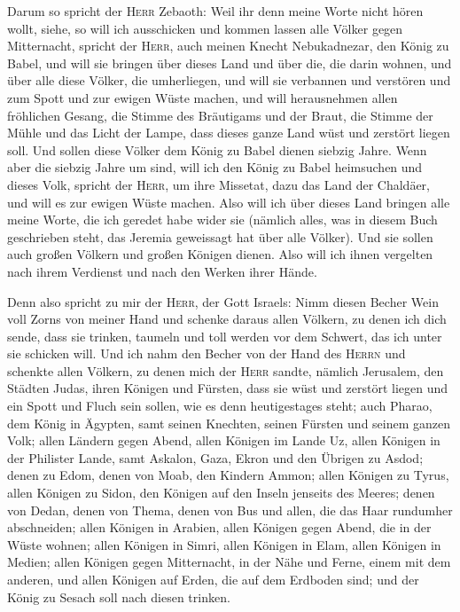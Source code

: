  Darum so spricht der \textsc{Herr} Zebaoth: Weil ihr denn
meine Worte nicht hören wollt,  siehe, so will ich
ausschicken und kommen lassen alle Völker gegen Mitternacht, spricht der
\textsc{Herr}, auch meinen Knecht Nebukadnezar, den König zu Babel, und
will sie bringen über dieses Land und über die, die darin wohnen, und
über alle diese Völker, die umherliegen, und will sie verbannen und
verstören und zum Spott und zur ewigen Wüste machen,  und
will herausnehmen allen fröhlichen Gesang, die Stimme des Bräutigams und
der Braut, die Stimme der Mühle und das Licht der Lampe, 
dass dieses ganze Land wüst und zerstört liegen soll. Und sollen diese
Völker dem König zu Babel dienen siebzig Jahre.  Wenn
aber die siebzig Jahre um sind, will ich den König zu Babel heimsuchen
und dieses Volk, spricht der \textsc{Herr}, um ihre Missetat, dazu das
Land der Chaldäer, und will es zur ewigen Wüste machen. 
Also will ich über dieses Land bringen alle meine Worte, die ich geredet
habe wider sie (nämlich alles, was in diesem Buch geschrieben steht, das
Jeremia geweissagt hat über alle Völker).  Und sie sollen
auch großen Völkern und großen Königen dienen. Also will ich ihnen
vergelten nach ihrem Verdienst und nach den Werken ihrer Hände.

 Denn also spricht zu mir der \textsc{Herr}, der Gott
Israels: Nimm diesen Becher Wein voll Zorns von meiner Hand und schenke
daraus allen Völkern, zu denen ich dich sende,  dass sie
trinken, taumeln und toll werden vor dem Schwert, das ich unter sie
schicken will.  Und ich nahm den Becher von der Hand des
\textsc{Herrn} und schenkte allen Völkern, zu denen mich der
\textsc{Herr} sandte,  nämlich Jerusalem, den Städten
Judas, ihren Königen und Fürsten, dass sie wüst und zerstört liegen und
ein Spott und Fluch sein sollen, wie es denn heutigestages steht;
 auch Pharao, dem König in Ägypten, samt seinen Knechten,
seinen Fürsten und seinem ganzen Volk;  allen Ländern
gegen Abend, allen Königen im Lande Uz, allen Königen in der Philister
Lande, samt Askalon, Gaza, Ekron und den Übrigen zu Asdod;
 denen zu Edom, denen von Moab, den Kindern Ammon;
 allen Königen zu Tyrus, allen Königen zu Sidon, den
Königen auf den Inseln jenseits des Meeres;  denen von
Dedan, denen von Thema, denen von Bus und allen, die das Haar rundumher
abschneiden;  allen Königen in Arabien, allen Königen
gegen Abend, die in der Wüste wohnen;  allen Königen in
Simri, allen Königen in Elam, allen Königen in Medien; 
allen Königen gegen Mitternacht, in der Nähe und Ferne, einem mit dem
anderen, und allen Königen auf Erden, die auf dem Erdboden sind; und der
König zu Sesach soll nach diesen trinken.

